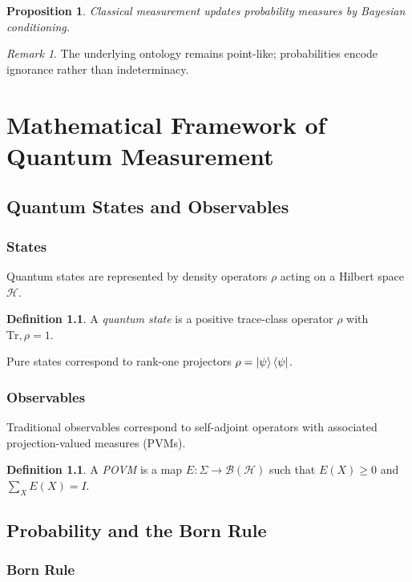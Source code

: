 \documentclass[12pt]{book}
\theoremstyle{plain}
\newtheorem{proposition}[theorem]{Proposition}
\theoremstyle{definition}
\newtheorem{definition}[theorem]{Definition}
\theoremstyle{remark}
\newtheorem{remark}[theorem]{Remark}
\begin{document}
\begin{proposition}
Classical measurement updates probability measures by Bayesian conditioning.
\end{proposition}

\begin{remark}
The underlying ontology remains point-like; probabilities encode ignorance rather than indeterminacy.
\end{remark}

\part{Mathematical Framework of Quantum Measurement}

\chapter{Quantum States and Observables}

\section{States}
Quantum states are represented by density operators $\rho$ acting on a Hilbert space $\mathcal{H}$.

\begin{definition}
A \emph{quantum state} is a positive trace-class operator $\rho$ with $\mathrm{Tr},\rho = 1$.
\end{definition}

Pure states correspond to rank-one projectors $\rho = \ket{\psi}\bra{\psi}$.

\section{Observables}
Traditional observables correspond to self-adjoint operators with associated projection-valued measures (PVMs).

\begin{definition}
A \emph{POVM} is a map $E : \Sigma \to \mathcal{B}(\mathcal{H})$ such that $E(X) \ge 0$ and $\sum_X E(X)=I$.
\end{definition}

\chapter{Probability and the Born Rule}

\section{Born Rule}
\end{document}
